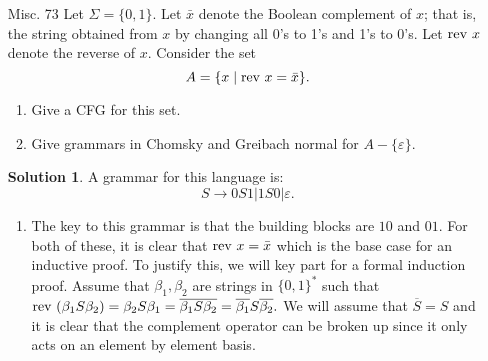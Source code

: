 \documentclass{article}
\newcommand{\setst}{\hspace{1mm} | \hspace{1mm} }
\newcommand{\rev}{\textnormal{rev }}
\renewcommand{\epsilon}{\varepsilon}
\theoremstyle{definition}
\newtheorem*{solution*}{Solution}
\begin{document}
\begin{enumerate}
\begin{proof}
		Case 2: There is no proper prefix of $x$ that satisfies $(*)$. Then, either $x = azb$ or $x = bza$. We can see that $z$ satisfies $(*)$ since
		\[\#a(z) = \#a(x)-1 = \#b(x)-1=\#b(z).\]
		So, by the induction hypothesis, $S \xrightarrow[G]{*} z$. Then, if $x = azb$, we can derive $x$ in the following way:
		\[S \xrightarrow[G]{1} aSb \xrightarrow[G]{*} azb = x.\]
		 If $x = bza$, we can derive $x$ in the following way:
		\[S \xrightarrow[G]{1} bSa \xrightarrow[G]{*} bza = x.\]
		In both cases, we have shown that if $x$ satisfies $(*)$, then $S \xrightarrow[G]{*} x$. 
	\end{proof}
	\item [Misc. 73] Let $\Sigma = \{0,1\}$. Let $\bar{x}$ denote the Boolean complement of $x$; that is, the string obtained from $x$ by changing all 0's to 1's and 1's to 0's. Let $\rev x$ denote the reverse of $x$. Consider the set
	\[A = \{x \setst \rev x = \bar{x}\}.\]
	\begin{enumerate}
		\item Give a CFG for this set.
		\item Give grammars in Chomsky and Greibach normal for $A - \{\epsilon\}$. 
	\end{enumerate}
	\begin{solution*}
		A grammar for this language is:
		\[S \rightarrow 0S1 | 1S0 | \epsilon.\]
	\end{solution*}
	\begin{enumerate}
		\item 	The key to this grammar is that the building blocks are $10$ and $01$. For both of these, it is clear that $\rev x = \bar{x}$ which is the base case for an inductive proof. To justify this, we will key part for a formal induction proof. Assume that $\beta_1,\beta_2$ are strings in $\{0,1\}^*$ such that $ \rev (\beta_1 S \beta_2) = \beta_2 S\beta_1 = \overline{\beta_1S\beta_2} = \overline{\beta_1}S\overline{\beta_2}.$ We will assume that $\overline{S} = S$ and it is clear that the complement operator can be broken up since it only acts on an element by element basis.
		

\end{enumerate}
\end{enumerate}
\end{document}
